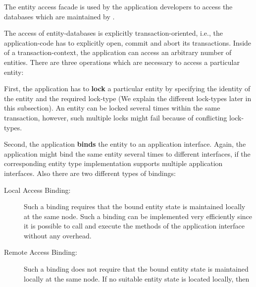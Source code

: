 \documentclass[a4paper, 10pt]{book}
\begin{document}
                The entity access facade is used by the application developers to
                access the databases which are maintained by \SYNEIGHT.

                The access of entity-databases is explicitly transaction-oriented,
                i.e., the application-code has to explicitly open, commit and abort
                its transactions. 
                Inside of a transaction-context, the application can access an
                arbitrary number of entities. There are three operations which are
                necessary to access a particular entity:
                \begin{description}
                    \item First, the application has to \textbf{lock} a particular entity
                        by specifying the identity of the entity and the required lock-type
                        (We explain the different lock-types later in this subsection).
                        An entity can be locked several times within the same transaction,
                        however, such multiple locks might fail because of conflicting
                        lock-types.
                    \item Second, the application \textbf{binds} the entity to an
                        application interface. Again, the application might bind the same
                        entity several times to different interfaces, if the corresponding
                        entity type implementation supports multiple application interfaces.
                        Also there are two different types of bindings:
                        \begin{description}
                            \item[Local Access Binding:] Such a binding requires that the bound
                                entity state is maintained locally at the same node. 
                                Such a binding can be implemented very efficiently since it is
                                possible to call and execute the methods of the application
                                interface without any overhead.
                            \item[Remote Access Binding:] Such a binding does not require that
                                the bound entity state is maintained locally at the same
                                node. If no suitable entity state is located locally, then \SYNEIGHT

\end{description}
\end{description}
\end{document}
